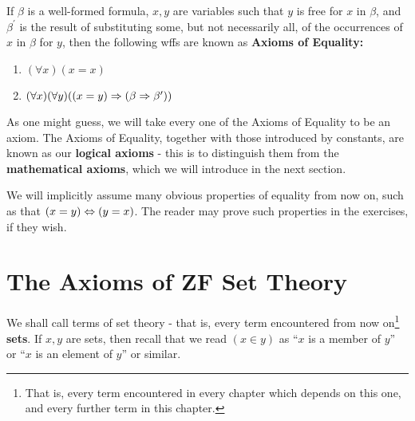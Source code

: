 \begin{axm}
\label{Axiom: Equality}
If $\beta$ is a well-formed formula, $x, y$ are variables such that $y$ is free for $x$ in $\beta$, and $\beta^\prime$ is the result of substituting some, but not necessarily all, of the occurrences of $x$ in $\beta$ for $y$, then the following wffs are known as \textbf{Axioms of Equality:}
\begin{enumerate}
\item $(\forall x)(x=x)$

\item $(\forall x)(\forall y)((x=y)\Rightarrow(\beta\Rightarrow\beta^\prime))$
\end{enumerate}

As one might guess, we will take every one of the Axioms of Equality to be an axiom. The Axioms of Equality, together with those introduced by constants, are known as our \textbf{logical axioms} - this is to distinguish them from the \textbf{mathematical axioms}, which we will introduce in the next section. 

We will implicitly assume many obvious properties of equality from now on, such as that $(x=y)\Leftrightarrow(y=x)$. The reader may prove such properties in the exercises, if they wish.
\end{axm}

\newpage

\section{The Axioms of ZF Set Theory}
\label{- Sec: The Axioms of ZF Set Theory}

\begin{convention}
\label{Conv: Everything is a set}
We shall call terms of set theory - that is, every term encountered from now on\footnote{That is, every term encountered in every chapter which depends on this one, and every further term in this chapter.} \textbf{sets}. If $x, y$ are sets, then recall that we read $(x\in y)$ as \enquote{$x$ is a member of $y$} or \enquote{$x$ is an element of $y$} or similar. 
\end{convention}

